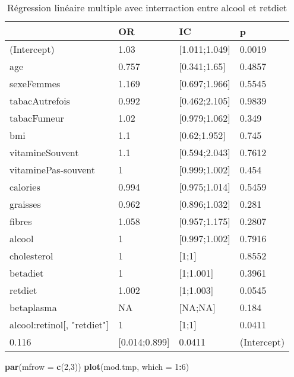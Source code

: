 \documentclass[]{article}
\newenvironment{Shaded}{\begin{snugshade}}{\end{snugshade}}
\newcommand{\KeywordTok}[1]{\textcolor[rgb]{0.13,0.29,0.53}{\textbf{#1}}}
\newcommand{\DataTypeTok}[1]{\textcolor[rgb]{0.13,0.29,0.53}{#1}}
\newcommand{\DecValTok}[1]{\textcolor[rgb]{0.00,0.00,0.81}{#1}}
\newcommand{\OperatorTok}[1]{\textcolor[rgb]{0.81,0.36,0.00}{\textbf{#1}}}
\newcommand{\NormalTok}[1]{#1}
\begin{document}
\begin{table}

\caption{\label{tab:unnamed-chunk-91}Régression linéaire multiple avec interraction entre alcool et retdiet}
\centering
\begin{tabular}[t]{l|l|l|l}
\hline
  & OR & IC & p\\
\hline
\rowcolor[HTML]{BBD2E1}  (Intercept) & 1.03 & [1.011;1.049] & 0.0019\\
\hline
age & 0.757 & [0.341;1.65] & 0.4857\\
\hline
\rowcolor[HTML]{BBD2E1}  sexeFemmes & 1.169 & [0.697;1.966] & 0.5545\\
\hline
tabacAutrefois & 0.992 & [0.462;2.105] & 0.9839\\
\hline
\rowcolor[HTML]{BBD2E1}  tabacFumeur & 1.02 & [0.979;1.062] & 0.349\\
\hline
bmi & 1.1 & [0.62;1.952] & 0.745\\
\hline
\rowcolor[HTML]{BBD2E1}  vitamineSouvent & 1.1 & [0.594;2.043] & 0.7612\\
\hline
vitaminePas-souvent & 1 & [0.999;1.002] & 0.454\\
\hline
\rowcolor[HTML]{BBD2E1}  calories & 0.994 & [0.975;1.014] & 0.5459\\
\hline
graisses & 0.962 & [0.896;1.032] & 0.281\\
\hline
\rowcolor[HTML]{BBD2E1}  fibres & 1.058 & [0.957;1.175] & 0.2807\\
\hline
alcool & 1 & [0.997;1.002] & 0.7916\\
\hline
\rowcolor[HTML]{BBD2E1}  cholesterol & 1 & [1;1] & 0.8552\\
\hline
betadiet & 1 & [1;1.001] & 0.3961\\
\hline
\rowcolor[HTML]{BBD2E1}  retdiet & 1.002 & [1;1.003] & 0.0545\\
\hline
betaplasma & NA & [NA;NA] & 0.184\\
\hline
\rowcolor[HTML]{BBD2E1}  alcool:retinol[, "retdiet"] & 1 & [1;1] & 0.0411\\
\hline
0.116 & [0.014;0.899] & 0.0411 & (Intercept)\\
\hline
\end{tabular}
\end{table}

\begin{Shaded}
\begin{Highlighting}[]
\KeywordTok{par}\NormalTok{(}\DataTypeTok{mfrow =} \KeywordTok{c}\NormalTok{(}\DecValTok{2}\NormalTok{,}\DecValTok{3}\NormalTok{))}
\KeywordTok{plot}\NormalTok{(mod.tmp, }\DataTypeTok{which =} \DecValTok{1}\OperatorTok{:}\DecValTok{6}\NormalTok{)}
\end{Highlighting}
\end{Shaded}
\end{document}
